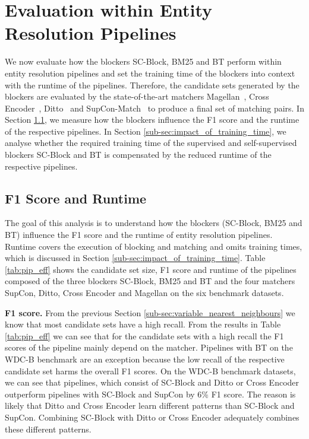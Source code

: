 \documentclass[sigconf,nonacm]{acmart}
\begin{document}
\section{Evaluation within Entity Resolution Pipelines}
\label{sec:evaluation_pipeline}
We now evaluate how the blockers SC-Block, BM25 and BT perform within entity resolution pipelines and set the training time of the blockers into context with the runtime of the pipelines.
Therefore, the candidate sets generated by the blockers are evaluated by the state-of-the-art matchers Magellan~\cite{konda_magellan_2016},  Cross Encoder~\cite{brunner_entity_2020}, Ditto~\cite{li_deep_2020} and SupCon-Match~\cite{peeters_supervised_2022} to produce a final set of matching pairs. 
In Section \ref{sub_sec:pip_eff_eff}, we measure how the blockers influence the F1 score and the runtime of the respective pipelines.
In Section \ref{sub-sec:impact_of_training_time}, we analyse whether the required training time of the supervised and self-supervised blockers SC-Block and BT is compensated by the reduced runtime of the respective pipelines.

















\subsection{F1 Score and Runtime}
\label{sub_sec:pip_eff_eff}

The goal of this analysis is to understand how the blockers (SC-Block, BM25 and BT) influence the F1 score and the runtime of entity resolution pipelines.
Runtime covers the execution of blocking and matching and omits training times,
which is discussed in Section \ref{sub-sec:impact_of_training_time}.
Table \ref{tab:pip_eff} shows the candidate set size, F1 score and runtime of the pipelines composed of the three blockers SC-Block, BM25 and BT and the four matchers SupCon, Ditto, Cross Encoder and Magellan on the six benchmark datasets.


\vspace{.1cm}\noindent\textbf{F1 score.}
From the previous Section \ref{sub-sec:variable_nearest_neighbours} we know that most candidate sets have a high recall. From the results in Table \ref{tab:pip_eff} we can see that for the candidate sets with a high recall the F1 scores of the pipeline mainly depend on the matcher. Pipelines with BT on the WDC-B benchmark are an exception because the low recall of the respective candidate set harms the overall F1 scores. On the WDC-B benchmark datasets, we can see that pipelines, which consist of SC-Block and Ditto or Cross Encoder outperform pipelines with SC-Block and SupCon by 6\% F1 score. The reason is likely that Ditto and Cross Encoder learn different patterns than SC-Block and SupCon. Combining SC-Block with Ditto or Cross Encoder adequately combines these different patterns.
\end{document}
